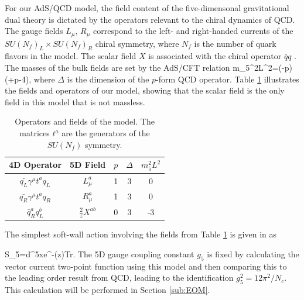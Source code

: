 For our AdS/QCD model, the field content of the five-dimensonal gravitational dual theory is dictated by the operators relevant to the chiral dynamics of QCD. 
The gauge fields $L_{\mu},\, R_{\mu}$ correspond to the left- and right-handed currents of the $SU(N_{f})_{L}\times SU(N_{f})_{R}$ chiral symmetry, where $N_{f}$ is the number of quark flavors in
the model. 
The scalar field $X$ is associated with the chiral operator $\bar{q}q$ \cite{stephanov-katz-son}. 
The masses of the bulk fields are set by the AdS/CFT relation \cite{colangelo-light-scalar-mesons} 
\be
m_{5}^{2}L^{2}=(\Delta-p)(\Delta+p-4), 
\ee
where $\Delta$ is the dimension of the $p$-form QCD operator. 
Table \ref{tab:Operators-and-fields} illustrates the fields and operators of our model, showing that the scalar field is the only field in this model that is not massless.

\begin{table}[htb]
\begin{center}
\begin{tabular}{|c|c|c|c|c|}
\hline 
4D Operator & 5D Field & $p$ & $\Delta$ & $m_{5}^{2}L^{2}$\\
\hline 
\hline 
$\bar{q_{L}}\gamma^{\mu}t^{a}q_{L}$ & $L_{\mu}^{a}$ & 1 & 3 & 0\\
\hline 
$\bar{q_{R}}\gamma^{\mu}t^{a}q_{R}$ & $R_{\mu}^{a}$ & 1 & 3 & 0\\
\hline 
$\bar{q}_{R}^{a}q_{L}^{b}$ & $\frac{2}{z}X^{ab}$ & 0 & 3 & -3\\
\hline 
\end{tabular}
\end{center}
\caption{Operators and fields of the model. The matrices $t^{a}$ are the generators of the $SU(N_{f})$ symmetry. 
\label{tab:Operators-and-fields}}
\end{table}

The simplest soft-wall action involving the fields from Table \ref{tab:Operators-and-fields}
is given in \cite{karch-katz-son-adsqcd} as 

\be
S_{5}=\int d^{5}xe^{-\Phi(z)}Tr.
\label{eq:SimpleAction}
\ee
The 5D gauge coupling constant $g_{5}$ is fixed by calculating the vector current two-point function using this model and then comparing this to the leading order result from QCD, leading to the identification $g_{5}^{2}=12\pi^{2}/N_{c}$.
This calculation will be performed in Section \ref{sub:EOM}. 

